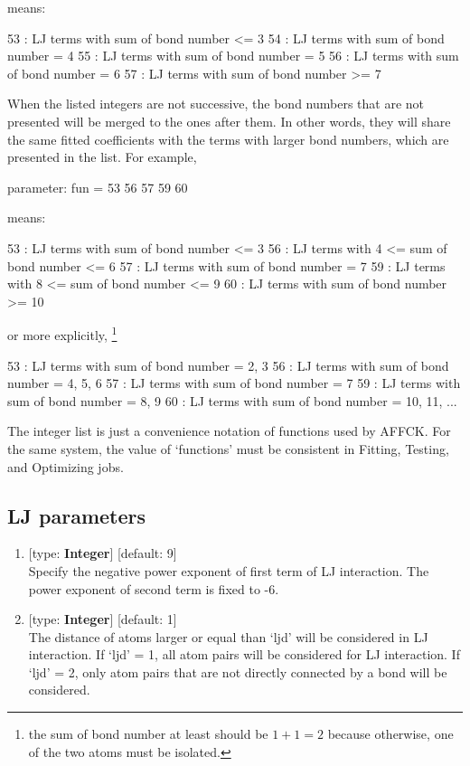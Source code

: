\documentclass[11pt]{book}
\begin{document}
means:

\begin{everbatim}
53 : LJ terms with sum of bond number <= 3
54 : LJ terms with sum of bond number  = 4
55 : LJ terms with sum of bond number  = 5
56 : LJ terms with sum of bond number  = 6
57 : LJ terms with sum of bond number >= 7
\end{everbatim}

When the listed integers are not successive, the bond numbers that are not presented will be merged to the ones after them. In other words, they will 
share the same fitted coefficients with the terms with larger bond numbers, which are presented in the list. For example, 

\begin{everbatim}
{ parameter: fun = 53 56 57 59 60 }
\end{everbatim}

means:

\begin{everbatim}
53 : LJ terms with sum of bond number <= 3
56 : LJ terms with 4 <= sum of bond number <= 6
57 : LJ terms with sum of bond number  = 7
59 : LJ terms with 8 <= sum of bond number <= 9
60 : LJ terms with sum of bond number >= 10
\end{everbatim}

or more explicitly, \footnote{the sum of bond number at least should be $1+1=2$ because otherwise, one of the two atoms must be isolated. }

\begin{everbatim}
53 : LJ terms with sum of bond number = 2, 3
56 : LJ terms with sum of bond number = 4, 5, 6
57 : LJ terms with sum of bond number = 7
59 : LJ terms with sum of bond number = 8, 9
60 : LJ terms with sum of bond number = 10, 11, ...
\end{everbatim}

The integer list is just a convenience notation of functions used by AFFCK. For the same system, the value of `functions' must be consistent in 
Fitting, Testing, and Optimizing jobs.

\subsection{LJ parameters}

\begin{enumerate}
\item {} [type: \textbf{Integer}] [default: 9] \\
	Specify the negative power exponent of first term of LJ interaction. The power exponent of second term 
	is fixed to -6.
\item {} [type: \textbf{Integer}] [default: 1] \\
	The distance of atoms larger or equal than `ljd' will be considered in LJ interaction. If `ljd' = 1, all atom pairs will be considered for 
	LJ interaction. If `ljd' = 2, only atom pairs that are not directly connected by a bond will be considered.
\end{enumerate}
\end{document}
